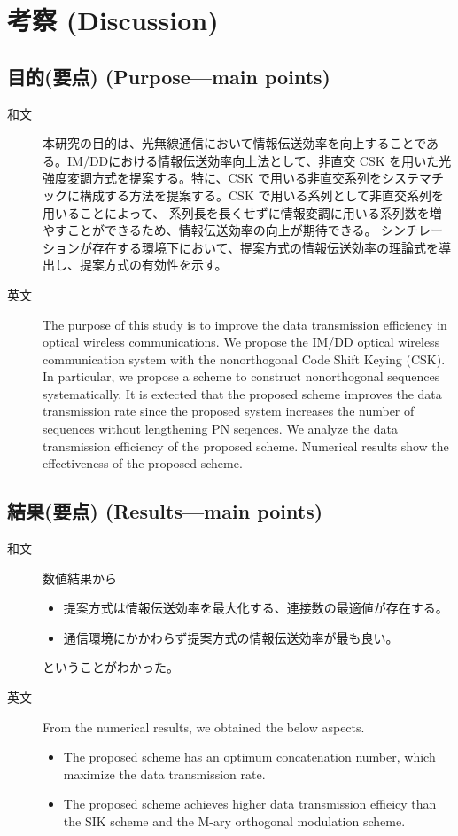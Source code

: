 ﻿\documentclass[a4j,10pt]{jarticle}
\begin{document}
\section{考察 (Discussion)}
\subsection{目的(要点) (Purpose---main points)}
\begin{description}
 \item[和文] 本研究の目的は、光無線通信において情報伝送効率を向上することである。IM/DDにおける情報伝送効率向上法として、非直交 CSK を用いた光強度変調方式を提案する。特に、CSK で用いる非直交系列をシステマチックに構成する方法を提案する。CSK で用いる系列として非直交系列を用いることによって、
系列長を長くせずに情報変調に用いる系列数を増やすことができるため、情報伝送効率の向上が期待できる。
シンチレーションが存在する環境下において、提案方式の情報伝送効率の理論式を導出し、提案方式の有効性を示す。
%
 \item[英文] The purpose of this study is to improve the data transmission efficiency in optical wireless communications. We propose the IM/DD optical wireless communication system with the nonorthogonal Code Shift Keying (CSK). In particular, we propose a scheme to construct nonorthogonal sequences systematically. It is extected that the proposed scheme improves the data transmission rate since the proposed system increases the number of sequences without lengthening PN seqences. We analyze the data transmission efficiency of the proposed scheme. Numerical results show the effectiveness of the proposed scheme.
\end{description}
%
\subsection{結果(要点) (Results---main points)}
\begin{description}
 \item[和文] 数値結果から
 \begin{itemize}
 \item 提案方式は情報伝送効率を最大化する、連接数の最適値が存在する。
 \item 通信環境にかかわらず提案方式の情報伝送効率が最も良い。
 \end{itemize}
ということがわかった。
%
 \item[英文] From the numerical results, we obtained the below aspects. 
 \begin{itemize}
 \item The proposed scheme has an optimum concatenation number, which maximize the data transmission rate. 
 \item The proposed scheme achieves higher data transmission effieicy than the SIK scheme and the M-ary orthogonal modulation scheme. 
 \end{itemize}
%
\end{description}
%
\end{document}
